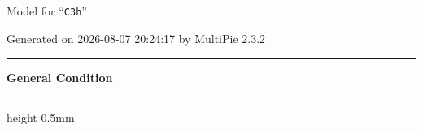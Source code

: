 \documentclass[fleqn,10pt,landscape]{jsarticle}
\begin{document}
\setcounter{MaxMatrixCols}{32}

\renewcommand{\tablename}{Table~}
\renewcommand{\figurename}{Figure~}
\setlength{\baselineskip}{16pt}
\setlength{\parindent}{0pt}
\setlength{\mathindent}{0pt}
\footnotesize
\begin{center}
\LARGE
Model for ``\texttt{C3h}''
\end{center}
\begin{flushright}
Generated on 2026-08-07 20:24:17 by MultiPie 2.3.2
\end{flushright}
\setlength{\baselineskip}{16pt}
\footnotesize
\vspace{5mm}
\noindent \rule[0.5mm]{5mm}{0.5mm}\hspace{3mm}\textbf{General Condition}\hspace{3mm}\leaders\hrule height 0.5mm\hfill\kern0pt
\vspace{3mm}
\end{document}
